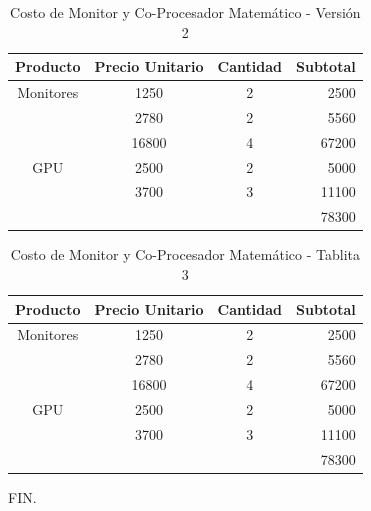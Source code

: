 \documentclass[]{article}
\begin{document}
\begin{table}[h]
	\centering
	\begin{tabular}{cccr}
		\hline
		Producto & Precio Unitario & Cantidad & Subtotal \\
		\hline
		Monitores & 1250 & 2 & 2500\\
		& 2780 & 2 & 5560 \\
		& 16800 & 4 & 67200 \\
		\hline
		GPU	 	  & 2500 & 2 & 5000\\
		& 3700 & 3 & 11100\\
		\cline{4-4}
		&      &   & 78300
	\end{tabular}
	\caption{Costo de Monitor y Co-Procesador Matemático - Versión 2}
	\label{table:2}
\end{table}

\lipsum[11-14]
\begin{table}[h]
	\centering
	\begin{tabular}{cccr}
		\hline
		Producto & Precio Unitario & Cantidad & Subtotal \\
		\hline
		Monitores & 1250 & 2 & 2500\\
		& 2780 & 2 & 5560 \\
		& 16800 & 4 & 67200 \\
		\hline
		GPU	 	  & 2500 & 2 & 5000\\
		& 3700 & 3 & 11100\\
		\cline{4-4}
		&      &   & 78300
	\end{tabular}
	\caption{Costo de Monitor y Co-Procesador Matemático - Tablita 3}
	\label{table:3}
\end{table}

FIN.
\newpage
\listoftables
\newpage
\listoffigures
\newpage
\tableofcontents
\end{document}

